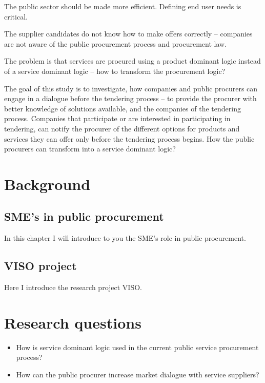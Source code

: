 \documentclass[12pt,a4paper,oneside,pdftex]{report}
\begin{document}
The public sector should be made more efficient. Defining end user needs is critical.

The supplier candidates do not know how to make offers correctly – companies are not aware of the public procurement process and procurement law. 

The problem is that services are procured using a product dominant logic instead of a service dominant logic – how to transform the procurement logic?

The goal of this study is to investigate, how companies and public procurers can engage in a dialogue before the tendering process – to provide the procurer with better knowledge of solutions available, and the companies of the tendering process.  Companies that participate or are interested in participating in tendering, can notify the procurer of the different options for products and services they can offer only before the tendering process begins.
How the public procurers can transform into a service dominant logic?
\section{Background}

\subsection{SME's in public procurement}
In this chapter I will introduce to you the SME's role in public procurement. 

\subsection{VISO project}
Here I introduce the research project VISO.

\section{Research questions}
\begin{itemize}
\setlength{\itemsep}{0pt}
\item How is service dominant logic used in the current public service procurement process?
\item How can the public procurer increase market dialogue with service suppliers?
\end{itemize}
\end{document}
